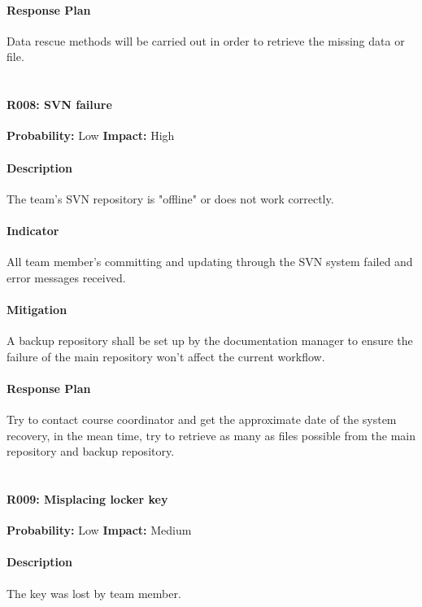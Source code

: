 \documentclass[11pt, a4paper]{report}
\begin{document}
	\paragraph{Response Plan}Data rescue methods will be carried out in order to retrieve the missing data or file.\\\\

	\paragraph{R008: SVN failure} \hspace{1cm} \textbf{Probability: }Low\hspace{1cm}   \textbf{Impact: }High
	\paragraph{Description}The team's SVN repository is "offline" or does not work correctly.
	\paragraph{Indicator}All team member's committing and updating through the SVN system failed and error messages received.
	\paragraph{Mitigation}A backup repository shall be set up by the documentation manager to ensure the failure of the main repository won't affect the current workflow.
	\paragraph{Response Plan}Try to contact course coordinator and get the approximate date of the system recovery, in the mean time, try to retrieve as many as files possible from the main repository and backup repository.\\\\

\pagebreak

	\paragraph{R009: Misplacing locker key} \hspace{1cm} \textbf{Probability: }Low\hspace{1cm}   \textbf{Impact: }Medium
	\paragraph{Description}The key was lost by team member. 
\end{document}
